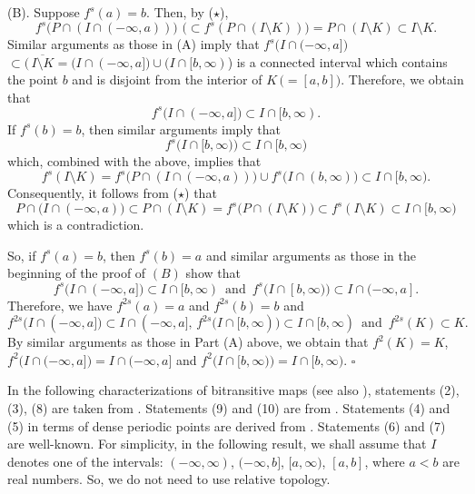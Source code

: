 \documentclass[12pt]{article}
\newcommand{\sq}{$\square$}
\begin{document}
(B). Suppose $f^s(a) = b$.  Then, by ($\star$), 
$$
f^s\big(P \cap (I \cap (-\infty, a))\big) \,\, \big(\subset f^s(P \cap (I \setminus K))\big) = P \cap (I \setminus K) \subset I \setminus K.
$$
\indent Similar arguments as those in (A) imply that $f^s\big(I \cap (-\infty, a]\big)$ $\subset \big(\, \overline{I \setminus K} = \big(I \cap (-\infty, a]\big) \cup \big(I \cap [b, \infty)$\big) is a connected interval which contains the point $b$ and is disjoint from the interior of $K \, \big(= [a, b]\big)$.  Therefore, we obtain that 
$$
f^s\big(I \cap (-\infty, a]\big) \subset I \cap [b, \infty).
$$
If $f^s(b) = b$, then similar arguments imply that 
$$
f^s\big(I \cap [b, \infty)\big) \subset I \cap [b, \infty)
$$
which, combined with the above, implies that
$$
f^s(I \setminus K) = f^s\big(P \cap (I \cap (-\infty, a))\big) \cup f^s\big(I \cap (b, \infty)\big) \subset I \cap [b, \infty).
$$
Consequently, it follows from ($\star$) that 
$$
P \cap \big(I \cap (-\infty, a)\big) \subset P \cap (I \setminus K) = f^s\big(P \cap (I \setminus K)\big) \subset f^s(I \setminus K) \subset I \cap [b, \infty)
$$
which is a contradiction.  

So, if $f^s(a) = b$, then $f^s(b) = a$ and similar arguments as those in the beginning of the proof of $(B)$ show that $$
f^s\big(I \cap (-\infty, a]\big) \subset I \cap [b, \infty) \,\,\, \text{and} \,\,\, f^s\big(I \cap [b, \infty)\big) \subset I \cap (-\infty, a].
$$ 
Therefore, we have $f^{2s}(a) = a$ and $f^{2s}(b) = b$ and $$f^{2s}\big(I \cap (-\infty, a]\big) \subset I \cap (-\infty, a], \, f^{2s}\big(I \cap [b, \infty)\big) \subset I \cap [b, \infty) \,\,\, \text{and} \,\,\, f^{2s}(K) \subset K.$$  By similar arguments as those in Part (A) above, we obtain that $f^2(K) = K$, $f^2\big(I \cap (-\infty, a]\big) = I \cap (-\infty, a]$ and $f^2\big(I \cap [b, \infty)\big) = I \cap [b, \infty)$.
\hfill\sq

\vspace{.2in}
In the following characterizations of bitransitive maps (see also {\bf\cite{du1}}), statements (2), (3), (8) are taken from {\bf\cite{barge1}}.  Statements (9) and (10) are from {\bf\cite{barge3}}.  Statements (4) and (5) in terms of dense periodic points are derived from {\bf\cite{barge2}}.  Statements (6) and (7) are well-known.  For simplicity, in the following result, we shall assume that $I$ denotes one of the intervals: $(-\infty, \infty)$, $(-\infty, b]$, $[a, \infty)$, $[a, b]$, where $a < b$ are real numbers.  So, we do not need to use relative topology.
\end{document}
